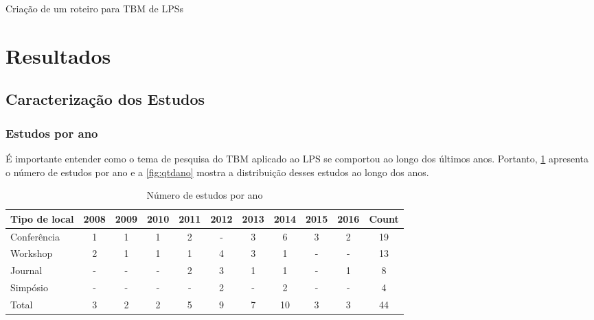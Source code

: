 Criação de um roteiro para TBM de LPSs

\section{Resultados}
\label{sec:results}

\subsection{Caracterização dos Estudos}

\subsubsection{Estudos por ano}

É importante entender como o tema de pesquisa do TBM aplicado ao LPS se comportou ao longo dos últimos anos. Portanto, \ref{table:listaano} apresenta o número de estudos por ano e a \ref{fig:qtdano} mostra a distribuição desses estudos ao longo dos anos.

\begin{table}[!ht]
	\centering
	\tiny
	\caption{Número de estudos por ano}
	\label{table:listaano}
	
	\begin{tabular}{|l|c|c|c|c|c|c|c|c|c|c|} \hline 
		
		\textbf{Tipo de local} & \textbf{2008} & \textbf{2009} & \textbf{2010} & \textbf{2011} & \textbf{2012} & \textbf{2013} & \textbf{2014} & \textbf{2015} & \textbf{2016} & \textbf{Count}\\\hline \hline
		
		
		Conferência &  1 & 1 & 1 & 2 & - & 3 & 6 & 3 & 2 & 19 \\\hline
		
		Workshop &  2 & 1 & 1 & 1 & 4 & 3 & 1 & - & - & 13 \\\hline
		
		Journal &  - & - & - & 2 & 3 & 1 & 1 & - & 1 & 8 \\\hline
		
		Simpósio & - & - & - & - & 2 & - & 2 & - & - & 4 \\\hline
		
		Total &  3 & 2 & 2 & 5 & 9 & 7 & 10 & 3 & 3 & 44 \\\hline
		
		
		
	\end{tabular}
\end{table}

